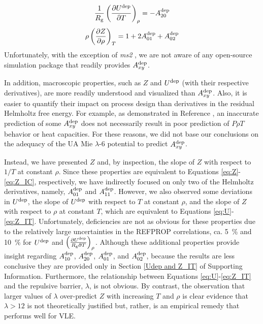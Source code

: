 \documentclass[preprint,letterpaper,floatfix,citeautoscript,aip,jcp]{revtex4-1}
\begin{document}
\begin{equation} \label{eq:U_IC}
\frac{1}{R_{\rm g}} \left(\frac{\partial U^{\rm dep}}{\partial T}\right)_\rho = -A_{20}^{\rm dep} 
\end{equation} 
\begin{equation} \label{eq:Z_IT}
\rho \left(\frac{\partial Z}{\partial \rho}\right)_T = 1 + 2 A_{01}^{\rm dep} + A_{02}^{\rm dep} 
\end{equation}
Unfortunately, with the exception of \textit{ms2} \cite{ms2}, we are not aware of any open-source simulation package that readily provides $A_{xy}^{\rm dep}$. 

In addition, macroscopic properties, such as $Z$ and $U^{\rm dep}$ (with their respective derivatives), are more readily understood and visualized than $A_{xy}^{\rm dep}$. Also, it is easier to quantify their impact on process design than derivatives in the residual Helmholtz free energy. For example, as demonstrated in 
Reference , an inaccurate prediction of some $A_{xy}^{\rm dep}$ does not necessarily result in poor prediction of $P \rho T$ behavior or heat capacities. For these reasons, we did not base our conclusions on the adequacy of the UA Mie $\lambda$-6 potential to predict $A_{xy}^{\rm dep}$.

Instead, we have presented $Z$ and, by inspection, the slope of $Z$ with respect to $1/T$ at constant $\rho$. Since these properties are equivalent to Equations \ref{eq:Z}-\ref{eq:Z_IC}, respectively, we have indirectly focused on only two of the Helmholtz derivatives, namely, $A_{01}^{\rm dep}$ and $A_{11}^{\rm dep}$. However, we also observed some deviations in $U^{\rm dep}$, the slope of $U^{\rm dep}$ with respect to $T$ at constant $\rho$, and the slope of $Z$ with respect to $\rho$ at constant $T$, which are equivalent to Equations \ref{eq:U}-\ref{eq:Z_IT}. Unfortunately, deficiencies are not as obvious for these properties due to the relatively large uncertainties in the REFPROP correlations, ca. 5~\% and 10~\% for $U^{\rm dep}$ and $\left(\frac{\partial U^{\rm dep}}{R_{\rm g} \partial T}\right)_\rho$. Although these additional properties provide insight regarding $A_{10}^{\rm dep}$, $A_{20}^{\rm dep}$, $A_{01}^{\rm dep}$, and $A_{02}^{\rm dep}$, because the results are less conclusive they are provided only in Section \ref{Udep and Z_IT} of Supporting Information. Furthermore, the relationship between Equations \ref{eq:U}-\ref{eq:Z_IT} and the repulsive barrier, $\lambda$, is not obvious. By contrast, the observation that larger values of $\lambda$ over-predict $Z$ with increasing $T$ and $\rho$ is clear evidence that $\lambda > 12$ is not theoretically justified but, rather, is an empirical remedy that performs well for VLE.
\end{document}

